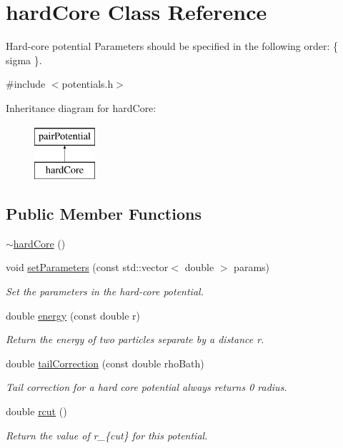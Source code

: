 \hypertarget{classhard_core}{}\section{hard\+Core Class Reference}
\label{classhard_core}


Hard-\/core potential Parameters should be specified in the following order\+: \{ sigma \}.  




{\ttfamily \#include $<$potentials.\+h$>$}

Inheritance diagram for hard\+Core\+:\begin{figure}[H]
\begin{center}
\leavevmode
\includegraphics[height=2.000000cm]{classhard_core}
\end{center}
\end{figure}
\subsection*{Public Member Functions}
\begin{DoxyCompactItemize}
\item 
\hyperlink{classhard_core_aea5b04b2f9271269d6365ff7ed633151}{$\sim$hard\+Core} ()
\item 
void \hyperlink{classhard_core_a2bbf6a77445f5cb5fc1a3c37ba0e6566}{set\+Parameters} (const std\+::vector$<$ double $>$ params)
\begin{DoxyCompactList}\small\item\em Set the parameters in the hard-\/core potential. \end{DoxyCompactList}\item 
double \hyperlink{classhard_core_a5be8073d4b94045473352c9b56af69e5}{energy} (const double r)
\begin{DoxyCompactList}\small\item\em Return the energy of two particles separate by a distance r. \end{DoxyCompactList}\item 
double \hyperlink{classhard_core_a90c73dbda39a9c48f1f26474474183e4}{tail\+Correction} (const double rho\+Bath)
\begin{DoxyCompactList}\small\item\em Tail correction for a hard core potential always returns 0 radius. \end{DoxyCompactList}\item 
double \hyperlink{classhard_core_a3cbf5ecde18b2f2798a4b1aba1801ca5}{rcut} ()
\begin{DoxyCompactList}\small\item\em Return the value of r\+\_\+\{cut\} for this potential. \end{DoxyCompactList}\end{DoxyCompactItemize}
